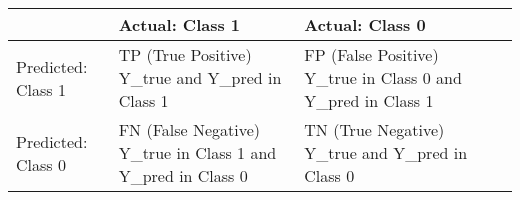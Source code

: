\documentclass[10pt,a4paper]{article}
\theoremstyle{break}
\begin{document}
\begin{longtable}[]{@{}lllll@{}}
\toprule
\begin{minipage}[b]{0.14\columnwidth}\raggedright
\strut
\end{minipage} & \begin{minipage}[b]{0.34\columnwidth}\raggedright
Actual: Class 1\strut
\end{minipage} & \begin{minipage}[b]{0.34\columnwidth}\raggedright
Actual: Class 0\strut
\end{minipage} & \begin{minipage}[b]{0.02\columnwidth}\raggedright
\strut
\end{minipage} & \begin{minipage}[b]{0.02\columnwidth}\raggedright
\strut
\end{minipage}\tabularnewline
\midrule
\endhead
\begin{minipage}[t]{0.14\columnwidth}\raggedright
Predicted: Class 1\strut
\end{minipage} & \begin{minipage}[t]{0.34\columnwidth}\raggedright
TP (True Positive) Y\_true and Y\_pred in Class 1\strut
\end{minipage} & \begin{minipage}[t]{0.34\columnwidth}\raggedright
FP (False Positive) Y\_true in Class 0 and Y\_pred in Class 1\strut
\end{minipage} & \begin{minipage}[t]{0.02\columnwidth}\raggedright
\strut
\end{minipage} & \begin{minipage}[t]{0.02\columnwidth}\raggedright
\strut
\end{minipage}\tabularnewline
\begin{minipage}[t]{0.14\columnwidth}\raggedright
Predicted: Class 0\strut
\end{minipage} & \begin{minipage}[t]{0.34\columnwidth}\raggedright
FN (False Negative) Y\_true in Class 1 and Y\_pred in Class 0\strut
\end{minipage} & \begin{minipage}[t]{0.34\columnwidth}\raggedright
TN (True Negative) Y\_true and Y\_pred in Class 0\strut
\end{minipage} & \begin{minipage}[t]{0.02\columnwidth}\raggedright
\strut
\end{minipage} & \begin{minipage}[t]{0.02\columnwidth}\raggedright
\strut
\end{minipage}\tabularnewline
\bottomrule
\end{longtable}
\end{document}
